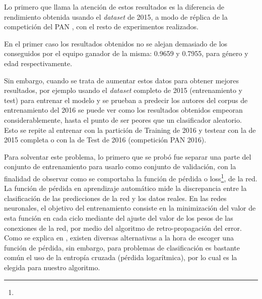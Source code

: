 \begin{table}[hp!]
    \centering
    \caption{Precisión para género y edad en distintos experimentos realizados utilizando el enfoque propuesto por \cite{loscalis22} con las particiones de entrenamiento y test de las competiciones de PAN de 2015 y 2016.}
    \label{tab:resultados-bert}
\end{table}

Lo primero que llama la atención de estos resultados es la diferencia de rendimiento obtenida usando el \textit{dataset} de 2015, a modo de réplica de la competición del PAN \cite{pan:2015}, con el resto de experimentos realizados.

En el primer caso los resultados obtenidos no se alejan demasiado de los conseguidos por el equipo ganador de la misma: 0.9659 y 0.7955, para género y edad respectivamente.

Sin embargo, cuando se trata de aumentar estos datos para obtener mejores resultados, por ejemplo usando el \textit{dataset} completo de 2015 (entrenamiento y test) para entrenar el modelo y se prueban a predecir los autores del corpus de entrenamiento del 2016 se puede ver como los resultados obtenidos empeoran considerablemente, hasta el punto de ser peores que un clasificador aleatorio. Esto se repite al entrenar con la partición de Training de 2016 y testear con la de 2015 completa o con la de Test de 2016 (competición PAN 2016).

Para solventar este problema, lo primero que se probó fue separar una parte del conjunto de entrenamiento para usarlo como conjunto de validación, con la finalidad de observar como se comportaba la función de pérdida o loss\footnote{}, de la red.
\\ La función de pérdida en aprendizaje automático mide la discrepancia entre la clasificación de las predicciones de la red y los datos reales. En las redes neuronales, el objetivo del entrenamiento consiste en la minimización del valor de esta función en cada ciclo mediante del ajuste del valor de los pesos de las conexiones de la red, por medio del algoritmo de retro-propagación del error. Como se explica en \cite{janocha2017loss}, existen diversas alternativas a la hora de escoger una función de pérdida, sin embargo, para problemas de clasificación es bastante común el uso de la entropía cruzada (pérdida logarítmica), por lo cual es la elegida para nuestro algoritmo.

